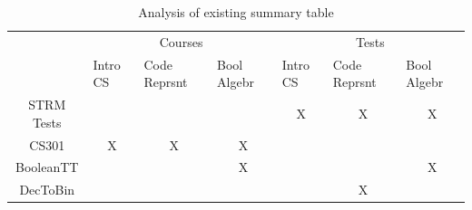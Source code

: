 \begin{table}[h!]
\begin{center}
		\begin{tabular}{c|lll|lcl|}
		\cline{2-7}
		\multicolumn{1}{l|}{}                   & \multicolumn{3}{c|}{Courses}                                                                                                                     & \multicolumn{3}{c|}{Tests}                                                                                                                       \\ \cline{2-7} 
		\multicolumn{1}{l|}{\multirow{-2}{*}{}} & \multicolumn{1}{l|}{Intro CS}                  & \multicolumn{1}{l|}{Code Reprsnt}              & Bool Algebr                                    & \multicolumn{1}{l|}{Intro CS}                  & \multicolumn{1}{l|}{Code Reprsnt}              & Bool Algebr                                    \\ \hline
		\multicolumn{1}{|c|}{STRM Tests}        & \multicolumn{1}{l|}{}                          & \multicolumn{1}{l|}{}                          &                                                & \multicolumn{1}{c|}{\cellcolor[HTML]{96FFFB}X} & \multicolumn{1}{c|}{\cellcolor[HTML]{96FFFB}X} & \multicolumn{1}{c|}{\cellcolor[HTML]{96FFFB}X} \\ \hline
		\multicolumn{1}{|c|}{CS301}             & \multicolumn{1}{c|}{\cellcolor[HTML]{96FFFB}X} & \multicolumn{1}{c|}{\cellcolor[HTML]{96FFFB}X} & \multicolumn{1}{c|}{\cellcolor[HTML]{96FFFB}X} & \multicolumn{1}{l|}{}                          & \multicolumn{1}{l|}{}                          &                                                \\ \hline
		\multicolumn{1}{|c|}{BooleanTT}         & \multicolumn{1}{l|}{}                          & \multicolumn{1}{l|}{}                          & \multicolumn{1}{c|}{\cellcolor[HTML]{96FFFB}X} & \multicolumn{1}{l|}{}                          & \multicolumn{1}{c|}{\cellcolor[HTML]{FFFFFF}}  & \multicolumn{1}{c|}{\cellcolor[HTML]{96FFFB}X} \\ \hline
		\multicolumn{1}{|c|}{DecToBin}          & \multicolumn{1}{l|}{}                          & \multicolumn{1}{l|}{}                          &                                                & \multicolumn{1}{l|}{}                          & \multicolumn{1}{c|}{\cellcolor[HTML]{96FFFB}X} &                                                \\ \hline
		\end{tabular}
\end{center}
\caption{Analysis of existing summary table}
\label{tab:AnalysisOfExistingSummaryTable}
\end{table}

